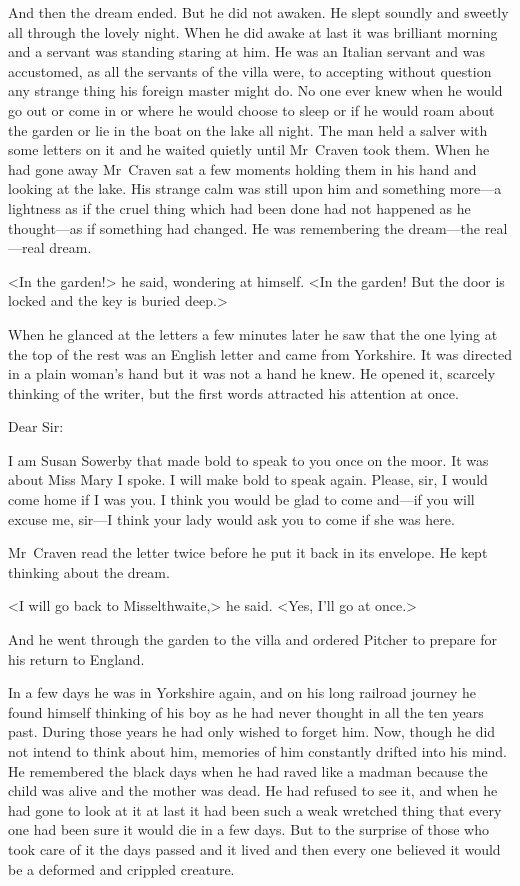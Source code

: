 And then the dream ended. But he did not awaken. He slept soundly and sweetly all through the lovely night. When he did awake at last it was brilliant morning and a servant was standing staring at him. He was an Italian servant and was accustomed, as all the servants of the villa were, to accepting without question any strange thing his foreign master might do. No one ever knew when he would go out or come in or where he would choose to sleep or if he would roam about the garden or lie in the boat on the lake all night. The man held a salver with some letters on it and he waited quietly until Mr~Craven took them. When he had gone away Mr~Craven sat a few moments holding them in his hand and looking at the lake. His strange calm was still upon him and something more—a lightness as if the cruel thing which had been done had not happened as he thought—as if something had changed. He was remembering the dream—the real—real dream.

<In the garden!> he said, wondering at himself. <In the garden! But the door is locked and the key is buried deep.>

When he glanced at the letters a few minutes later he saw that the one lying at the top of the rest was an English letter and came from Yorkshire. It was directed in a plain woman's hand but it was not a hand he knew. He opened it, scarcely thinking of the writer, but the first words attracted his attention at once.

\begin{mail}{}{Dear Sir:}

I am Susan Sowerby that made bold to speak to you once on the moor. It was about Miss Mary I spoke. I will make bold to speak again. Please, sir, I would come home if I was you. I think you would be glad to come and—if you will excuse me, sir—I think your lady would ask you to come if she was here.

\end{mail}

Mr~Craven read the letter twice before he put it back in its envelope. He kept thinking about the dream.

<I will go back to Misselthwaite,> he said. <Yes, I'll go at once.>

And he went through the garden to the villa and ordered Pitcher to prepare for his return to England.

In a few days he was in Yorkshire again, and on his long railroad journey he found himself thinking of his boy as he had never thought in all the ten years past. During those years he had only wished to forget him. Now, though he did not intend to think about him, memories of him constantly drifted into his mind. He remembered the black days when he had raved like a madman because the child was alive and the mother was dead. He had refused to see it, and when he had gone to look at it at last it had been such a weak wretched thing that every one had been sure it would die in a few days. But to the surprise of those who took care of it the days passed and it lived and then every one believed it would be a deformed and crippled creature.

